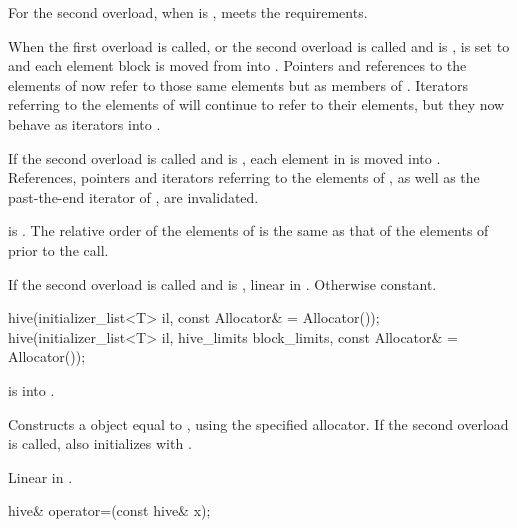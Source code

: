 \begin{itemdescr}
\pnum
\expects
For the second overload,
when  is ,
 meets the  requirements.

\pnum
\effects
When the first overload is called, or
the second overload is called and
 is ,
 is set to  and
each element block is moved from  into .
Pointers and references to the elements of  now refer to
those same elements but as members of .
Iterators referring to the elements of 
will continue to refer to their elements,
but they now behave as iterators into .

If the second overload is called and
 is ,
each element in  is moved into .
References, pointers and iterators referring to the elements of , as well as the past-the-end iterator of , are invalidated.

\pnum
\ensures
{} is .
The relative order of the elements of 
is the same as that of the elements of  prior to the call.

\pnum
\complexity
If the second overload is called and
 is , linear in .
Otherwise constant.
\end{itemdescr}

%
\begin{itemdecl}
hive(initializer_list<T> il, const Allocator& = Allocator());
hive(initializer_list<T> il, hive_limits block_limits, const Allocator& = Allocator());
\end{itemdecl}

\begin{itemdescr}
\pnum
\expects
{} is  into .

\pnum
\effects
Constructs a  object equal to ,
using the specified allocator.
If the second overload is called,
also initializes  with .

\pnum
\complexity
Linear in .
\end{itemdescr}

%
\begin{itemdecl}
hive& operator=(const hive& x);
\end{itemdecl}

